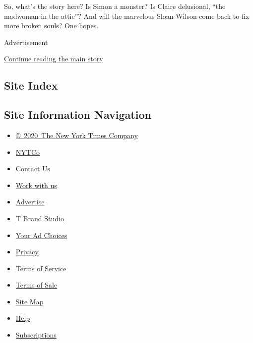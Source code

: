 So, what's the story here? Is Simon a monster? Is Claire delusional,
``the madwoman in the attic''? And will the marvelous Sloan Wilson come
back to fix more broken souls? One hopes.

Advertisement

\protect\hyperlink{after-bottom}{Continue reading the main story}

\hypertarget{site-index}{%
\subsection{Site Index}\label{site-index}}

\hypertarget{site-information-navigation}{%
\subsection{Site Information
Navigation}\label{site-information-navigation}}

\begin{itemize}
\tightlist
\item
  \href{https://help.nytimes3xbfgragh.onion/hc/en-us/articles/115014792127-Copyright-notice}{©~2020~The
  New York Times Company}
\end{itemize}

\begin{itemize}
\tightlist
\item
  \href{https://www.nytco.com/}{NYTCo}
\item
  \href{https://help.nytimes3xbfgragh.onion/hc/en-us/articles/115015385887-Contact-Us}{Contact
  Us}
\item
  \href{https://www.nytco.com/careers/}{Work with us}
\item
  \href{https://nytmediakit.com/}{Advertise}
\item
  \href{http://www.tbrandstudio.com/}{T Brand Studio}
\item
  \href{https://www.nytimes3xbfgragh.onion/privacy/cookie-policy\#how-do-i-manage-trackers}{Your
  Ad Choices}
\item
  \href{https://www.nytimes3xbfgragh.onion/privacy}{Privacy}
\item
  \href{https://help.nytimes3xbfgragh.onion/hc/en-us/articles/115014893428-Terms-of-service}{Terms
  of Service}
\item
  \href{https://help.nytimes3xbfgragh.onion/hc/en-us/articles/115014893968-Terms-of-sale}{Terms
  of Sale}
\item
  \href{https://spiderbites.nytimes3xbfgragh.onion}{Site Map}
\item
  \href{https://help.nytimes3xbfgragh.onion/hc/en-us}{Help}
\item
  \href{https://www.nytimes3xbfgragh.onion/subscription?campaignId=37WXW}{Subscriptions}
\end{itemize}
